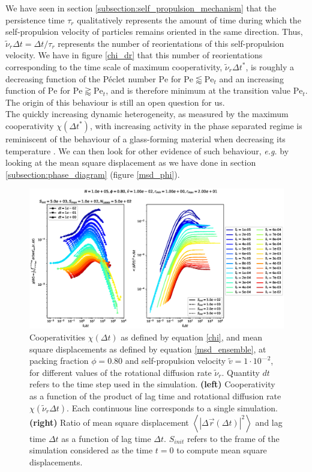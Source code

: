 \documentclass[class=report, float=false, crop=false]{standalone}
\begin{document}
We have seen in section \ref{subsection:self_propulsion_mechanism} that the persistence time $\tau_r$ qualitatively represents the amount of time during which the self-propulsion velocity of particles remains oriented in the same direction. Thus, $\tilde{\nu}_r \Delta t = \Delta t/\tau_r$ represents the number of reorientations of this self-propulsion velocity. We have in figure \ref{chi_dr} that this number of reorientations corresponding to the time scale of maximum cooperativity, $\tilde{\nu}_r \Delta t^*$, is roughly a decreasing function of the P\'eclet number $\text{Pe}$ for $\text{Pe} \lessapprox \text{Pe}_t$ and an increasing function of $\text{Pe}$ for $\text{Pe} \gtrapprox \text{Pe}_t$, and is therefore minimum at the transition value $\text{Pe}_t$. The origin of this behaviour is still an open question for us.\\

The quickly increasing dynamic heterogeneity, as measured by the maximum cooperativity $\chi(\Delta t^*)$, with increasing activity in the phase separated regime is reminiscent of the behaviour of a glass-forming material when decreasing its temperature \cite{berthier2011dynamic, cavagna2009supercooled}. We can then look for other evidence of such behaviour, \textit{e.g.} by looking at the mean square displacement as we have done in section \ref{subsection:phase_diagram} (figure \ref{msd_phi}).\\

\begin{figure}[h!]
\centering
\includegraphics[width=\textwidth]{figures/figs/intCuu_msdt_Dk8000_Vj1000_Nq1000_Io5000_Mn1000_Cn5000_RMINl1000_RMAXm2000.eps}
\caption{Cooperativities $\chi(\Delta t)$ as defined by equation \ref{chi}, and mean square displacements as defined by equation \ref{msd_ensemble}, at packing fraction $\phi = 0.80$ and self-propulsion velocity $\tilde{v} = 1\cdot10^{—2}$, for different values of the rotational diffusion rate $\tilde{\nu}_r$. Quantity $dt$ refers to the time step used in the simulation. \textbf{(left)} Cooperativity as a function of the product of lag time and rotational diffusion rate $\chi(\tilde{\nu}_r \Delta t)$. Each continuous line corresponds to a single simulation. \textbf{(right)} Ratio of mean square displacement $\left<|\Delta\vec{r}(\Delta t)|^2\right>$ and lag time $\Delta t$ as a function of lag time $\Delta t$. $S_{init}$ refers to the frame of the simulation considered as the time $t=0$ to compute mean square displacements.}
\label{chi_dr_msd}
\end{figure}
\end{document}

